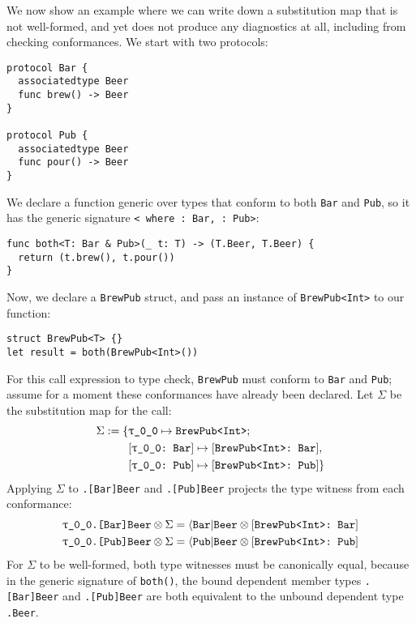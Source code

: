\documentclass[../generics]{subfiles}
\begin{document}
We now show an example where we can write down a substitution map that is not well-formed, and yet  does not produce any diagnostics at all, including from checking conformances. We start with two protocols:
\begin{Verbatim}
protocol Bar {
  associatedtype Beer
  func brew() -> Beer
}

protocol Pub {
  associatedtype Beer
  func pour() -> Beer
}
\end{Verbatim}
We declare a function generic over types that conform to both \texttt{Bar} and \texttt{Pub}, so it has the generic signature \texttt{<\rT\ where \rT:~Bar, \rT:~Pub>}:
\begin{Verbatim}
func both<T: Bar & Pub>(_ t: T) -> (T.Beer, T.Beer) {
  return (t.brew(), t.pour())
}
\end{Verbatim}
Now, we declare a \texttt{BrewPub} struct, and pass an instance of \texttt{BrewPub<Int>} to our function:
\begin{Verbatim}
struct BrewPub<T> {}
let result = both(BrewPub<Int>())
\end{Verbatim}
For this call expression to type check, \texttt{BrewPub} must conform to \texttt{Bar} and \texttt{Pub}; assume for a moment these conformances have already been declared. Let $\Sigma$ be the substitution map for the call:
\begin{align*}
\Sigma := \SubstMapC{
&\SubstType{\rT}{BrewPub<Int>}}{\\
&\SubstConf{\rT}{BrewPub<Int>}{Bar},\\
&\SubstConf{\rT}{BrewPub<Int>}{Pub}
}
\end{align*}
Applying $\Sigma$ to \texttt{\rT.[Bar]Beer} and \texttt{\rT.[Pub]Beer} projects the type witness from each conformance:
\begin{gather*}
\texttt{\rT.[Bar]Beer}\otimes\Sigma = \AssocType{Bar}{Beer}\otimes\ConfReq{BrewPub<Int>}{Bar}\\
\texttt{\rT.[Pub]Beer}\otimes\Sigma = \AssocType{Pub}{Beer}\otimes\ConfReq{BrewPub<Int>}{Pub}
\end{gather*}
For $\Sigma$ to be well-formed, both type witnesses must be canonically equal, because in the generic signature of \texttt{both()}, the bound dependent member types \texttt{\rT.[Bar]Beer} and \texttt{\rT.[Pub]Beer} are both equivalent to the unbound dependent type \texttt{\rT.Beer}.
\end{document}
